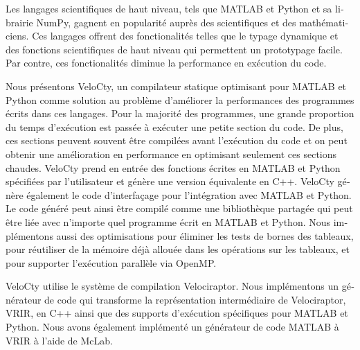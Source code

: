 \begin{otherlanguage}{french} 
Les langages scientifiques de haut niveau, tels que MATLAB et Python                                
et sa librairie NumPy, gagnent en popularité auprès des scientifiques                               
et des mathématiciens.  Ces langages offrent des fonctionalités telles                              
que le typage dynamique et des fonctions scientifiques de haut niveau                               
qui permettent un prototypage facile.  Par contre, ces fonctionalités                               
diminue la performance en exécution du code.  

Nous présentons VeloCty,                              
un compilateur statique optimisant pour MATLAB et Python comme                                      
solution au problème d'améliorer la performances des programmes écrits                              
dans ces langages.  Pour la majorité des programmes, une grande                                     
proportion du temps d'exécution est passée à exécuter une petite                                    
section du code.  De plus, ces sections peuvent souvent être compilées                              
avant l'exécution du code et on peut obtenir une amélioration en                                    
performance en optimisant seulement ces sections chaudes.  VeloCty                                  
prend en entrée des fonctions écrites en MATLAB et Python spécifiées                                
par l'utilisateur et génère une version équivalente en C++.  VeloCty                                
génère également le code d'interfaçage pour l'intégration avec MATLAB                               
et Python.  Le code généré peut ainsi être compilé comme une                                        
bibliothèque partagée qui peut être liée avec n'importe quel programme                              
écrit en MATLAB et Python.  Nous implémentons aussi des optimisations                               
pour éliminer les tests de bornes des tableaux, pour réutiliser de la                               
mémoire déjà allouée dans les opérations sur les tableaux, et pour                                  
supporter l'exécution parallèle via OpenMP.                                                         
                                                                                                    
VeloCty utilise le système de compilation Velociraptor.  Nous                                       
implémentons un générateur de code qui transforme la représentation                                 
intermédiaire de Velociraptor, VRIR, en C++ ainsi que des supports                                  
d'exécution spécifiques pour MATLAB et Python.  Nous avons également                                
implémenté un générateur de code MATLAB à VRIR à l'aide de McLab.                                   
                                                                                                    

\end{otherlanguage}
